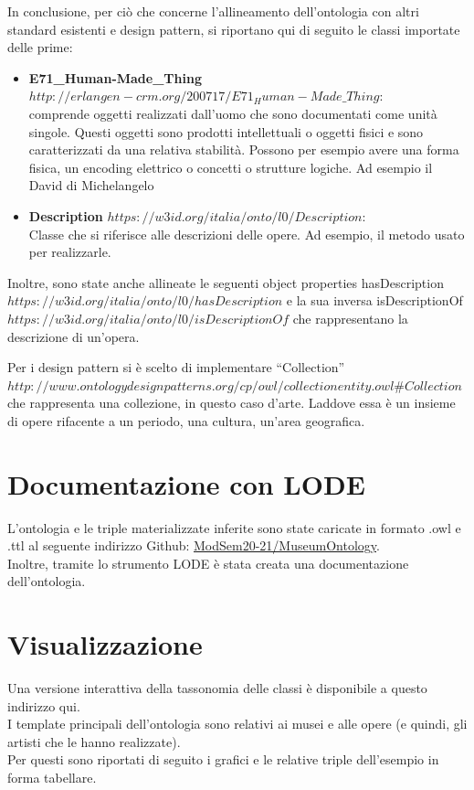\documentclass[12pt]{article}
\begin{document}
In conclusione, per ciò che concerne l’allineamento dell’ontologia con altri standard esistenti e design pattern, si riportano qui di seguito le classi importate delle prime:
\begin{itemize}
 \item \textbf{E71\_Human-Made\_Thing} $http://erlangen-crm.org/200717/E71_Human-Made\_Thing$:\\ comprende oggetti realizzati dall’uomo che sono documentati come unità singole. Questi oggetti sono prodotti intellettuali o oggetti fisici e sono caratterizzati da una relativa stabilità. Possono per esempio avere una forma fisica, un encoding elettrico o concetti o strutture logiche. Ad esempio il David di Michelangelo
 \item \textbf{Description} $https://w3id.org/italia/onto/l0/Description$:\\ Classe che si riferisce alle descrizioni delle opere. Ad esempio, il metodo usato per realizzarle.
\end{itemize} 
 
 Inoltre, sono state anche allineate le seguenti object properties hasDescription \\$https://w3id.org/italia/onto/l0/hasDescription$ e la sua inversa isDescriptionOf \\$https://w3id.org/italia/onto/l0/isDescriptionOf$ che rappresentano la descrizione di un’opera.

Per i design pattern si è scelto di implementare “Collection” \\$http://www.ontologydesignpatterns.org/cp/owl/collectionentity.owl\#Collection$ che rappresenta una collezione, in questo caso d'arte. Laddove essa è un insieme di opere rifacente a un periodo, una cultura, un'area geografica.
\newpage
\section{Documentazione con LODE}
L’ontologia e le triple materializzate inferite sono state caricate in formato .owl e .ttl al seguente indirizzo Github: \href{https://github.com/ModSem20-21/MuseumOntology/tree/master/Ontologia}{ModSem20-21/MuseumOntology}.\\
Inoltre, tramite lo strumento LODE è stata creata una documentazione dell’ontologia. 
\newpage
\section{Visualizzazione}
Una versione interattiva della tassonomia delle classi è disponibile a questo indirizzo qui.\\
I template principali dell'ontologia sono relativi ai musei e alle opere (e quindi, gli artisti che le hanno realizzate).\\
Per questi sono riportati di seguito i grafici e le relative triple dell'esempio in forma tabellare.
\end{document}
